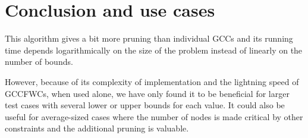 \documentclass[a4paper,10pt]{article}
\begin{document}
\section{Conclusion and use cases}

This algorithm gives a bit more pruning than individual GCCs and its running time depends logarithmically on the size of the problem instead of linearly on the number of bounds.

However, because of its complexity of implementation and the lightning speed of GCCFWCs, when used alone, we have only found it to be beneficial for larger test cases with several lower or upper bounds for each value. It could also be useful for average-sized cases where the number of nodes is made critical by other constraints and the additional pruning is valuable.
\end{document}
